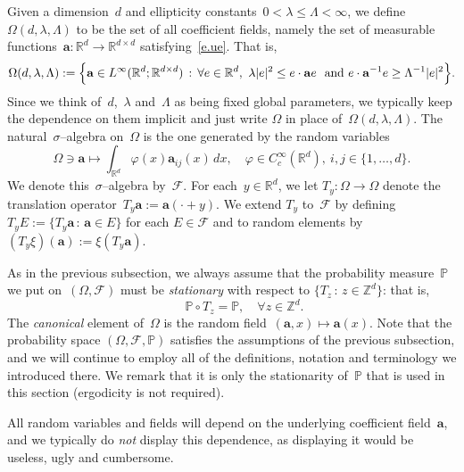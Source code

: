 \documentclass[11pt]{article} %
\numberwithin{equation}{section}
\theoremstyle{definition}
\newcommand*{\R}{\ensuremath{\mathbb{R}}}
\newcommand*{\Zd}{\ensuremath{\mathbb{Z}^d}}
\newcommand*{\Rd}{\ensuremath{\mathbb{R}^d}}
\renewcommand{\a}{\mathbf{a}}
\newcommand{\F}{\mathcal{F}}
\renewcommand{\P}{\mathbb{P}}
\begin{document}
\smallskip

Given a dimension~$d$ and ellipticity constants~$0 < \lambda\leq \Lambda <\infty$, we define $\Omega(d,\lambda,\Lambda)$ to be the set of all coefficient fields, namely the set of measurable functions~$\a:\Rd \to \R^{d\times d}$ satisfying~\eqref{e.ue}. That is, 
\begin{equation}
\label{e.Omega.dLambda}
\Omega(d,\lambda,\Lambda) : = 
\Bigl\{
\a \in L^\infty(\Rd;\R^{d\times d}) \,:\, \forall e \in\Rd, \ 
\lambda |e|^2 \leq e\cdot \a  e \ \ \mbox{and}
\ 
e \cdot \a^{-1} e 
\geq \Lambda^{-1}  |e|^2 
 \Bigr\}.
\end{equation}
Since we think of~$d$,~$\lambda$ and~$\Lambda$ as being fixed global parameters, we typically keep the dependence on them implicit and just write $\Omega$ in place of~$\Omega(d,\lambda,\Lambda)$. 
The natural~$\sigma$--algebra on~$\Omega$ is the one generated by the random variables 
\begin{equation}
\label{e.rvF}
\Omega \ni \a  \mapsto \int_{\Rd} \varphi(x)\a_{ij}(x)\,dx, \quad \varphi\in C^\infty_c(\Rd), \ i,j\in\{1,\ldots,d\}.
\end{equation}
We denote this~$\sigma$--algebra by~$\F$. 
For each~$y\in\Rd$, we let $T_y:\Omega \to \Omega$ denote the translation operator~$T_y\a := \a(\cdot+y)$.
We extend $T_y$ to~$\F$ by defining $T_y E := \{ T_y\a \,:\,\a\in E\}$ for each $E\in\F$ and to random elements by $(T_y\xi)(\a) := \xi(T_y\a)$. 

\smallskip

As in the previous subsection, we always assume that the probability measure~$\P$ we put on~$(\Omega,\F)$ must be \emph{stationary} with respect to $\{ T_z \,:\, z\in \Zd\}$:
that is, 
\begin{equation}
\label{e.Zdstat1}
\qquad
\P \circ T_z  = \P, \quad \forall z\in\Zd.
\end{equation}
The \emph{canonical} element of~$\Omega$ is the random field~$(\a,x) \mapsto \a(x)$. Note that the probability space $(\Omega,\F,\P)$ satisfies the assumptions of the previous subsection, and we will continue to employ all of the definitions, notation and terminology we introduced there.
We remark that it is only the stationarity of~$\P$ that is used in this section (ergodicity is not required).

\smallskip

All random variables and fields will depend on the underlying coefficient field~$\a$, and we typically do \emph{not} display this dependence, as displaying it would be useless, ugly and cumbersome. 
\end{document}
